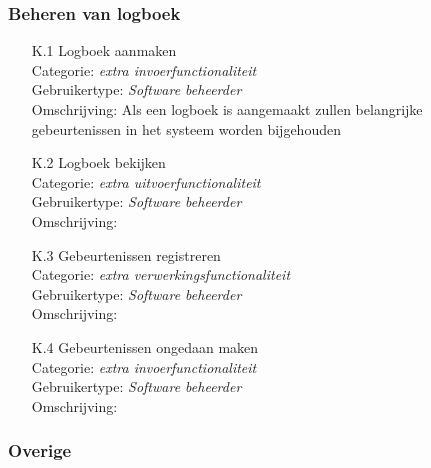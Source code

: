 \documentclass{article}
\begin{document}
\subsubsection{Beheren van logboek }

\begin{itemize}
\item[K.1] Logboek aanmaken \\
Categorie: \textit{extra  invoerfunctionaliteit} \\
Gebruikertype: \textit{Software beheerder} \\
Omschrijving: Als een logboek is aangemaakt zullen belangrijke gebeurtenissen in het systeem worden bijgehouden \\[-3mm]

\item[K.2] Logboek bekijken \\
Categorie: \textit{extra uitvoerfunctionaliteit} \\
Gebruikertype: \textit{Software beheerder} \\
Omschrijving: \\[-3mm]

\item[K.3] Gebeurtenissen registreren \\
Categorie: \textit{extra  verwerkingsfunctionaliteit} \\
Gebruikertype: \textit{Software beheerder} \\
Omschrijving: \\[-3mm]

\item[K.4] Gebeurtenissen ongedaan maken \\
Categorie: \textit{extra invoerfunctionaliteit} \\
Gebruikertype: \textit{Software beheerder} \\
Omschrijving: \\[-3mm]

\end{itemize}

\subsubsection{Overige}
\end{document}
